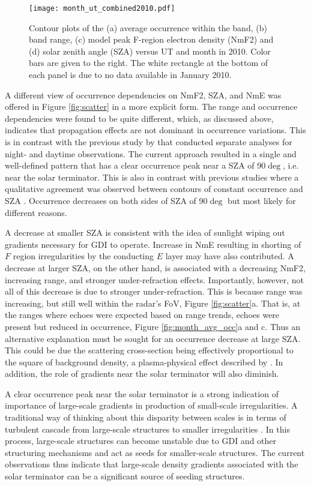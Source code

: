 \begin{figure}
\texttt{[image: month\_ut\_combined2010.pdf]}
\caption{Contour plots of the (a) average occurrence within the band, (b) band range, (c) model peak F-region electron density (NmF2) and (d) solar zenith angle (SZA) versus UT and month in 2010. Color bars are given to the right. The white rectangle at the bottom of each panel is due to no data available in January 2010.}
\label{fig:month_ut}
\end{figure}

A different view of occurrence dependencies on NmF2, SZA, and NmE was offered in Figure \ref{fig:scatter} in a more explicit form. The range and occurrence dependencies were found to be quite different, which, as discussed above, indicates that propagation effects are not dominant in occurrence variations. This is in contrast with the previous study by \citet{Kane2012} that conducted separate analyses for night- and daytime observations. The current approach resulted in a single and well-defined pattern that has a clear occurrence peak near a SZA of 90\(\deg\), i.e. near the solar terminator. This is also in contrast with previous studies where a qualitative agreement was observed between contours of constant occurrence and SZA \citep{Kane2012,Ghezelbash2014b}. Occurrence decreases on both sides of SZA of 90\(\deg\) but most likely for different reasons.

A decrease at smaller SZA is consistent with the idea of sunlight wiping out gradients necessary for GDI to operate. Increase in NmE resulting in shorting of \(F\) region irregularities by the conducting \(E\) layer may have also contributed. A decrease at larger SZA, on the other hand, is associated with a decreasing NmF2, increasing range, and stronger under-refraction effects. Importantly, however, not all of this decrease is due to stronger under-refraction. This is because range was increasing, but still well within the radar's FoV, Figure \ref{fig:scatter}a. That is, at the ranges where echoes were expected based on range trends, echoes were present but reduced in occurrence, Figure \ref{fig:month_avg_occ}a and c. Thus an alternative explanation must be sought for an occurrence decrease at large SZA. This could be due the scattering cross-section being effectively proportional to the square of background density, a plasma-physical effect described by \citet{Makarevich2014b}. In addition, the role of gradients near the solar terminator will also diminish.

A clear occurrence peak near the solar terminator is a strong indication of importance of large-scale gradients in production of small-scale irregularities. A traditional way of thinking about this disparity between scales is in terms of turbulent cascade from large-scale structures to smaller irregularities \citep{Tsunoda1988}. In this process, large-scale structures can become unstable due to GDI and other structuring mechanisms and act as seeds for smaller-scale structures. The current observations thus indicate that large-scale density gradients associated with the solar terminator can be a significant source of seeding structures.

